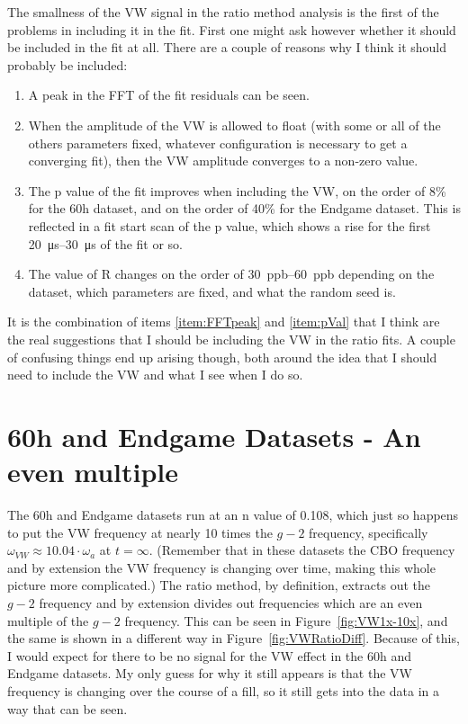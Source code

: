 \documentclass[12pt,letterpaper]{article}
\newcommand{\figref}[1]{Figure~\ref{#1}}
\def\gmtwo{$g-2$\xspace}
\begin{document}
The smallness of the VW signal in the ratio method analysis is the first of the problems in including it in the fit. First one might ask however whether it should be included in the fit at all. There are a couple of reasons why I think it should probably be included:
\begin{enumerate}
	\item\label{item:FFTpeak}{A peak in the FFT of the fit residuals can be seen.}
	\item\label{item:VWamp}{When the amplitude of the VW is allowed to float (with some or all of the others parameters fixed, whatever configuration is necessary to get a converging fit), then the VW amplitude converges to a non-zero value.}
	\item\label{item:pVal}{The p value of the fit improves when including the VW, on the order of 8\% for the 60h dataset, and on the order of 40\% for the Endgame dataset. This is reflected in a fit start scan of the p value, which shows a rise for the first \SIrange{20}{30}{\micro s} of the fit or so.}
	\item\label{item:Rchange}{The value of R changes on the order of \SIrange{30}{60}{ppb} depending on the dataset, which parameters are fixed, and what the random seed is.}
\end{enumerate}
It is the combination of items \ref{item:FFTpeak} and \ref{item:pVal} that I think are the real suggestions that I should be including the VW in the ratio fits. A couple of confusing things end up arising though, both around the idea that I should need to include the VW and what I see when I do so.


\section{60h and Endgame Datasets - An even multiple}

The 60h and Endgame datasets run at an n value of 0.108, which just so happens to put the VW frequency at nearly 10 times the \gmtwo frequency, specifically $\omega_{VW} \approx 10.04 \cdot \omega_{a}$ at $t = \infty$. (Remember that in these datasets the CBO frequency and by extension the VW frequency is changing over time, making this whole picture more complicated.) The ratio method, by definition, extracts out the \gmtwo frequency and by extension divides out frequencies which are an even multiple of the \gmtwo frequency. This can be seen in \figref{fig:VW1x-10x}, and the same is shown in a different way in \figref{fig:VWRatioDiff}. Because of this, I would expect for there to be no signal for the VW effect in the 60h and Endgame datasets. My only guess for why it still appears is that the VW frequency is changing over the course of a fill, so it still gets into the data in a way that can be seen. 
\end{document}
